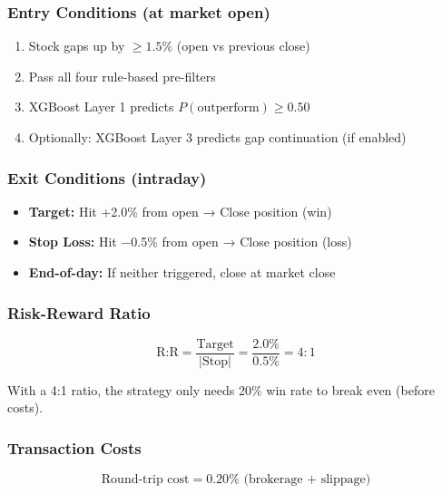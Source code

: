 \documentclass[11pt,a4paper]{article}
\begin{document}
\subsubsection{Entry Conditions (at market open)}

\begin{enumerate}
    \item Stock gaps up by $\geq 1.5\%$ (open vs previous close)
    \item Pass all four rule-based pre-filters
    \item XGBoost Layer 1 predicts $P(\text{outperform}) \geq 0.50$
    \item Optionally: XGBoost Layer 3 predicts gap continuation (if enabled)
\end{enumerate}

\subsubsection{Exit Conditions (intraday)}

\begin{itemize}
    \item \textbf{Target:} Hit +2.0\% from open → Close position (win)
    \item \textbf{Stop Loss:} Hit −0.5\% from open → Close position (loss)
    \item \textbf{End-of-day:} If neither triggered, close at market close
\end{itemize}

\subsubsection{Risk-Reward Ratio}

\begin{equation}
\text{R:R} = \frac{\text{Target}}{|\text{Stop}|} = \frac{2.0\%}{0.5\%} = 4:1
\end{equation}

With a 4:1 ratio, the strategy only needs 20\% win rate to break even (before costs).

\subsubsection{Transaction Costs}

\begin{equation}
\text{Round-trip cost} = 0.20\% \text{ (brokerage + slippage)}
\end{equation}
\end{document}
